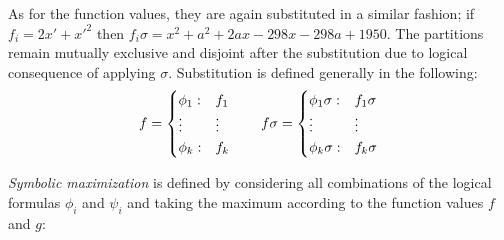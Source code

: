 \documentclass[letterpaper]{article}
\renewcommand{\-}{\text{-}}
\begin{document}
As for the function values, they are again substituted in a similar fashion; if  $f_i = 2x'+x'^{2}$  then  $f_i\sigma = x^{2} + a^{2} + 2ax - 298x -298a +1950 $. 
The partitions remain mutually exclusive and disjoint after the substitution due to logical consequence of applying $\sigma$. Substitution is defined generally in the following:
{\footnotesize
\begin{equation}
\begin{tabular}{r c c l}
&
\hspace{-6mm} 
  $f = \begin{cases}
    \phi_1: & f_1 \\ 
   \vdots&\vdots \\ 
    \phi_k: & f_k \\ 
  \end{cases}$
&

&
\hspace{-2mm}
  $f\sigma = \begin{cases}
    \phi_1\sigma: & f_1\sigma \\ 
   \vdots&\vdots \\ 
    \phi_k\sigma: & f_k\sigma \\ 
  \end{cases}$
\end{tabular}
\end{equation}
}

\emph{Symbolic maximization} is defined by considering all combinations of the logical formulas $\phi_i$ and $\psi_i$ and taking the maximum according to the function values $f$ and $g$:
\vspace{-5mm}
\end{document}
